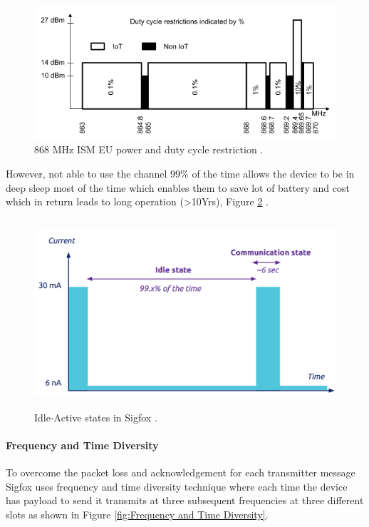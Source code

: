 \documentclass[12pt]{article}
\begin{document}
\begin{figure}[H]
  \includegraphics[width=\textwidth]{Images/duty_cycleLPWAN.png}
  \centering
  \caption{868 MHz ISM EU power and duty cycle restriction  \cite{etsi2012electromagnetic}.}
  \label{fig:ETSI duty Cycle and Power restriction}
\end{figure}

However, not able to use the channel 99\% of the time allows the device to be in deep sleep most of the time which enables them to save lot of battery and cost which in return leads to long operation (>10Yrs), Figure \ref{fig:Idle-Active states in Sigfox} .
\begin{figure}[H]
\centering
  \includegraphics[width=\columnwidth, height=7cm, keepaspectratio]{Images/ActiveSleepSigfox.pdf}
  \centering
  \caption{Idle-Active states in Sigfox  \cite{SigfoxTechnicalDoc}.}
  \label{fig:Idle-Active states in Sigfox}
\end{figure}

\paragraph{Frequency and Time Diversity}
To overcome the packet loss and acknowledgement for each transmitter message Sigfox uses frequency and time diversity technique where each time the device has payload to send it transmits at three subsequent frequencies at three different slots as shown in Figure \ref{fig:Frequency and Time Diversity}.
\end{document}
